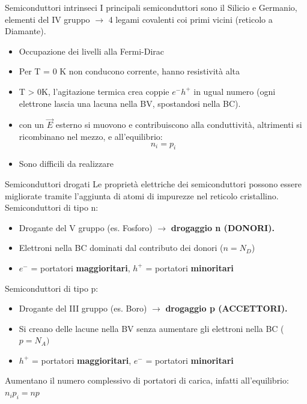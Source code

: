 \documentclass{beamer}
\begin{document}
\begin{frame}{Semiconduttori intrinseci}
    I principali semiconduttori sono il Silicio e Germanio, elementi del IV gruppo $\to$ 4 legami covalenti coi primi vicini (reticolo a Diamante).
    \begin{itemize}
        \item Occupazione dei livelli alla Fermi-Dirac
        \item Per T = 0 K non conducono corrente, hanno resistività alta
        \item T > 0K, l'agitazione termica crea coppie $e^- h^+$ in ugual numero (ogni elettrone lascia una lacuna nella BV, spostandosi nella BC).  
        \item con un $\overrightarrow{E}$ esterno si muovono e contribuiscono alla conduttività, altrimenti si ricombinano nel mezzo, e all'equilibrio:
        \begin{equation*}
            n_i = p_i
        \end{equation*}
        \item Sono difficili da realizzare
    \end{itemize}
\end{frame}


\begin{frame}{Semiconduttori drogati}
        Le proprietà elettriche dei semiconduttori possono essere migliorate tramite l'aggiunta di atomi di impurezze nel reticolo cristallino.
        \\ Semiconduttori di tipo n:
\begin{itemize}
    \item Drogante del V gruppo (es. Fosforo) $\to$ \textbf{drogaggio n (DONORI).}
    \item Elettroni nella BC dominati dal contributo dei donori ($n = N_D$)
    \item $e^-$ = portatori \textbf{maggioritari}, $h^+$ = portatori \textbf{minoritari}
    \end{itemize}
    Semiconduttori di tipo p:
    \begin{itemize}
    \item Drogante del III gruppo (es. Boro) $\to$ \textbf{drogaggio p (ACCETTORI).}
    \item Si creano delle lacune nella BV senza aumentare gli elettroni nella BC ($p = N_A)$ 
    \item $h^+$ = portatori \textbf{maggioritari}, $e^-$ = portatori \textbf{minoritari}
    \end{itemize}
    Aumentano il numero complessivo di portatori di carica, infatti all'equilibrio:  $n_i p_i = n p$
\end{frame}
\end{document}
